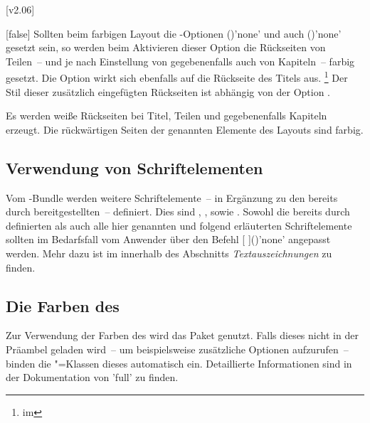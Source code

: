\begin{Declaration*}{}
\begin{Declaration*}{}
\begin{Declaration*}{}
[v2.06]
\begin{Declaration}{}[false]%
\printdeclarationlist%
%
%
%
%
%
Sollten beim farbigen Layout die \KOMAScript-Optionen 
()'none' und auch 
()'none' gesetzt sein, so werden beim 
Aktivieren dieser Option die Rückseiten von Teilen~-- und je nach Einstellung 
von  gegebenenfalls auch von Kapiteln~-- farbig gesetzt. 
Die Option wirkt sich ebenfalls auf die Rückseite des Titels aus.%
\footnote{%
   im \scrguide*%
}
Der Stil dieser zusätzlich eingefügten Rückseiten ist abhängig von der Option
.
%
\begin{values}{}
\itemfalse
  Es werden weiße Rückseiten bei Titel, Teilen und gegebenenfalls Kapiteln 
  erzeugt.
\itemtrue*
  Die rückwärtigen Seiten der genannten Elemente des Layouts sind farbig.
\end{values}
%
\end{Declaration}



\subsection{Verwendung von Schriftelementen}
%
%
%
Vom \TUDScript-Bundle werden weitere Schriftelemente~-- in Ergänzung zu den 
bereits durch \KOMAScript{} bereitgestellten~-- definiert. Dies sind 
, ,  sowie . 
Sowohl die bereits durch \KOMAScript{} definierten als auch alle hier genannten 
und folgend erläuterten Schriftelemente sollten im Bedarfsfall vom Anwender 
über den Befehl [%
]()'none' angepasst werden. Mehr dazu ist im \scrguide 
innerhalb des Abschnitts \emph{Textauszeichnungen} zu finden.


\subsection{Die Farben des \CDs}
%
%
Zur Verwendung der Farben des \CDs wird das Paket  
genutzt. Falls dieses nicht in der Präambel geladen wird~-- um beispielsweise 
zusätzliche Optionen aufzurufen~-- binden die \TUDScript"=Klassen dieses 
automatisch ein. Detaillierte Informationen sind in der Dokumentation von 
'full' zu finden.
%


\end{Declaration*}
\end{Declaration*}
\end{Declaration*}
